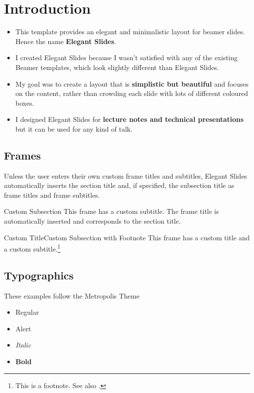 

\section{Introduction}
\begin{frame}
\begin{itemize}
    \item This template provides an elegant and minimalistic layout for beamer slides. Hence the name \alert{\textbf{Elegant Slides}}.
    \item I created Elegant Slides because I wasn't satisfied with any of the existing Beamer templates, which look slightly different than Elegant Slides.
    \item My goal was to create a layout that is \alert{\textbf{simplistic but beautiful}} and focuses on the content, rather than crowding each slide with lots of different coloured boxes.
    \item I designed Elegant Slides for \alert{\textbf{lecture notes and technical presentations}} but it can be used for any kind of talk. 
\end{itemize}
     
\end{frame}

\subsection{Frames}
\begin{frame}
    Unless the user enters their own custom frame titles and subtitles, Elegant Slides automatically inserts the section title and, if specified, the subsection title as frame titles and frame subtitles.
\end{frame}

\begin{frame}{}{Custom Subsection}
    This frame has a custom subtitle. The frame title is automatically inserted and corresponds to the section title.
\end{frame}

\begin{frame}{Custom Title}{Custom Subsection with Footnote}
    This frame has a custom title and a custom subtitle.\footnote{This is a footnote. See also \textcite{behrmann_invertible_2019}. }
\end{frame}

\subsection{Typographics}
\begin{frame}
    These examples follow the Metropolis Theme
    \begin{itemize}
        \item Regular
        \item \alert{Alert}
        \item \textit{Italic}
        \item \textbf{Bold}
    \end{itemize}
\end{frame}

